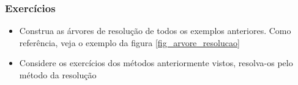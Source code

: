 \begin{frame}
\frametitle{Exercícios}

\begin{itemize}
\item Construa as árvores de resolução de todos os exemplos anteriores. Como referência, veja o exemplo da figura \ref{fig_arvore_resolucao}

\item Considere os exercícios dos métodos anteriormente vistos, resolva-os pelo método da resolução
\end{itemize}

\end{frame}

